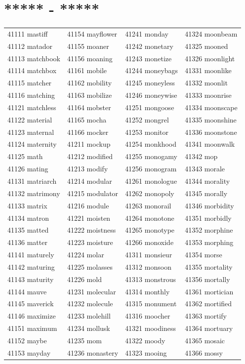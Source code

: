 \documentclass[10pt, oneside]{book}
\begin{document}
\begin{table}[h]
	\centering
	\section*{***** - *****}
	\begin{tabular}{l l l l}
41111 mastiff &41154 mayflower &41241 monday &41324 moonbeam\\
41112 matador &41155 moaner &41242 monetary &41325 mooned\\
41113 matchbook &41156 moaning &41243 monetize &41326 moonlight\\
41114 matchbox &41161 mobile &41244 moneybags &41331 moonlike\\
41115 matcher &41162 mobility &41245 moneyless &41332 moonlit\\
41116 matching &41163 mobilize &41246 moneywise &41333 moonrise\\
41121 matchless &41164 mobster &41251 mongoose &41334 moonscape\\
41122 material &41165 mocha &41252 mongrel &41335 moonshine\\
41123 maternal &41166 mocker &41253 monitor &41336 moonstone\\
41124 maternity &41211 mockup &41254 monkhood &41341 moonwalk\\
41125 math &41212 modified &41255 monogamy &41342 mop\\
41126 mating &41213 modify &41256 monogram &41343 morale\\
41131 matriarch &41214 modular &41261 monologue &41344 morality\\
41132 matrimony &41215 modulator &41262 monopoly &41345 morally\\
41133 matrix &41216 module &41263 monorail &41346 morbidity\\
41134 matron &41221 moisten &41264 monotone &41351 morbidly\\
41135 matted &41222 moistness &41265 monotype &41352 morphine\\
41136 matter &41223 moisture &41266 monoxide &41353 morphing\\
41141 maturely &41224 molar &41311 monsieur &41354 morse\\
41142 maturing &41225 molasses &41312 monsoon &41355 mortality\\
41143 maturity &41226 mold &41313 monstrous &41356 mortally\\
41144 mauve &41231 molecular &41314 monthly &41361 mortician\\
41145 maverick &41232 molecule &41315 monument &41362 mortified\\
41146 maximize &41233 molehill &41316 moocher &41363 mortify\\
41151 maximum &41234 mollusk &41321 moodiness &41364 mortuary\\
41152 maybe &41235 mom &41322 moody &41365 mosaic\\
41153 mayday &41236 monastery &41323 mooing &41366 mossy\\
	\end{tabular}
 \end{table}
\end{document}
